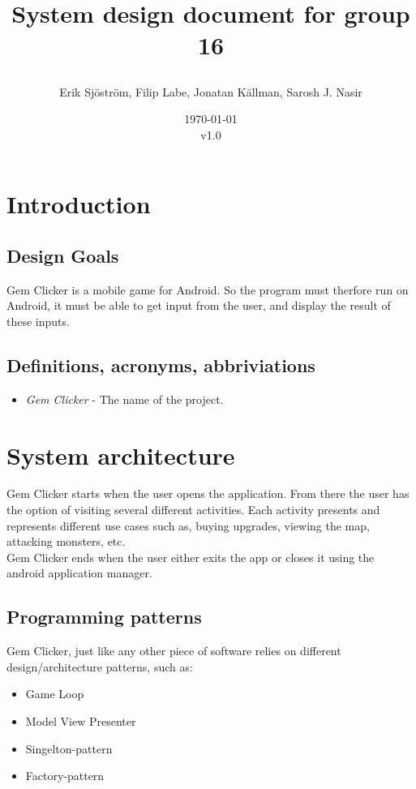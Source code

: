 \documentclass{article}
\title{
    System design document for group 16
    \author{Erik Sjöström,
            Filip Labe,
            Jonatan Källman,
            Sarosh J. Nasir}
    \date{\today \\v1.0}         
}
\begin{document}
\maketitle

\section{Introduction}

\subsection{Design Goals}

Gem Clicker is a mobile game for Android. So the program must therfore run on Android,
it must be able to get input from the user, and display the result of these inputs. 

\subsection{Definitions, acronyms, abbriviations}
\begin{itemize}
    \item \emph{Gem Clicker} - The name of the project.
\end{itemize}

\section{System architecture}

Gem Clicker starts when the user opens the application. From there the user has
the option of visiting several different activities. Each activity presents and
represents different use cases such as, buying upgrades, viewing the map, attacking monsters, etc. \\ \noindent
Gem Clicker ends when the user either exits the app or closes it using the android application manager.

\subsection{Programming patterns}
Gem Clicker, just like any other piece of software relies on different design/architecture patterns, such as:
\begin{itemize}
    \item Game Loop \cite{game-loop}
    \item Model View Presenter \cite{MVP}
    \item Singelton-pattern
    \item Factory-pattern
\end{itemize}
\end{document}
